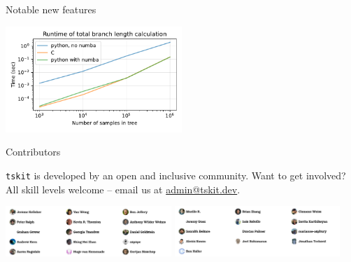 \documentclass[landscape,a0paper,fontscale=0.4]{baposter}
\newcommand{\tskit}{{\texttt{tskit}}}
\begin{document}
\begin{poster}
\begin{posterbox}[name=operations,column=3,above=bottom,span=1]{Notable new features}
\begin{multicols}{2}
\includegraphics[width=0.5\textwidth]{numba_runtime}
\end{multicols}

\end{posterbox}



\begin{posterbox}[name=refs,column=1,span=2,above=bottom]{Contributors}

\tskit{} is developed by an open and inclusive community.
Want to get involved?
All skill levels welcome -- email us at \url{admin@tskit.dev}.

\begin{center}
\includegraphics[width=0.47\textwidth]{tskit-contributors1}
\includegraphics[width=0.47\textwidth]{tskit-contributors2}
\end{center}


\end{posterbox}


\end{poster}%
\end{document}
